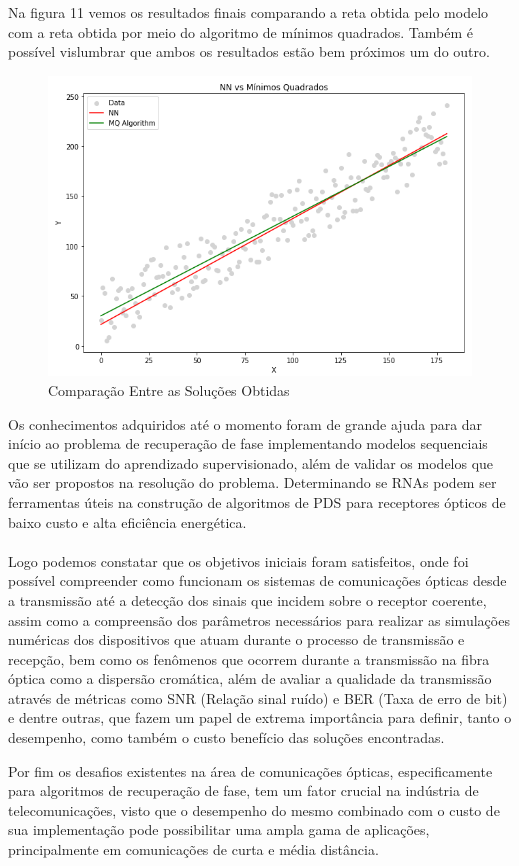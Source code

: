 \documentclass[12pt,openright,openany,oneside,article,a4paper,brazi]{abntex2}
\begin{document}
Na figura 11 vemos os resultados finais comparando a reta obtida pelo modelo com a reta obtida por meio do algoritmo de mínimos quadrados. Também é possível vislumbrar que ambos os resultados
estão bem próximos um do outro.

\begin{figure}[!htb]
  \centering
  \includegraphics[scale=0.6]{Comparação.PNG}
  \caption{Comparação Entre as Soluções Obtidas}
  \label{fig:}
\end{figure}

Os conhecimentos adquiridos até o momento foram de grande ajuda para dar início ao problema de recuperação de fase implementando modelos sequenciais que se utilizam 
do aprendizado supervisionado, além de validar os modelos que vão ser propostos na resolução do problema. Determinando se RNAs podem ser ferramentas úteis na construção
de algoritmos de PDS para receptores ópticos de baixo custo e alta eficiência energética. \\ \\

Logo podemos constatar que os objetivos iniciais foram satisfeitos, onde foi possível compreender como funcionam os sistemas de comunicações ópticas desde a transmissão até
a detecção dos sinais que incidem sobre o receptor coerente, assim como a compreensão dos parâmetros necessários para realizar as simulações numéricas dos dispositivos que atuam
durante o processo de transmissão e recepção, bem como os fenômenos que ocorrem durante a transmissão na fibra óptica como a dispersão cromática, além de avaliar a qualidade da transmissão
através de métricas como SNR (Relação sinal ruído) e BER (Taxa de erro de bit) e dentre outras, que fazem um papel de extrema importância para definir, tanto o desempenho, como também o custo 
benefício das soluções encontradas.

Por fim os desafios existentes na área de comunicações ópticas, especificamente para algoritmos de recuperação de fase, tem um fator crucial na indústria de telecomunicações, visto que
o desempenho do mesmo combinado com o custo de sua implementação pode possibilitar uma ampla gama de aplicações, principalmente em comunicações de curta e média distância. 

\newpage
%


\end{document}
